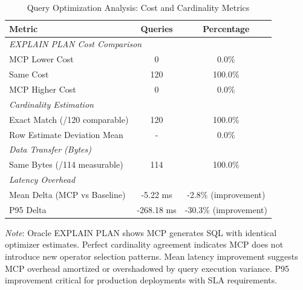 \begin{table}[h]
\centering
\caption{Query Optimization Analysis: Cost and Cardinality Metrics}
\label{tab:optimization_metrics}
\small
\begin{tabular}{lcc}
\toprule
\textbf{Metric} & \textbf{Queries} & \textbf{Percentage} \\
\midrule
\multicolumn{3}{l}{\textit{EXPLAIN PLAN Cost Comparison}} \\
MCP Lower Cost & 0 & 0.0\% \\
Same Cost & 120 & 100.0\% \\
MCP Higher Cost & 0 & 0.0\% \\
\midrule
\multicolumn{3}{l}{\textit{Cardinality Estimation}} \\
Exact Match (/120 comparable) & 120 & 100.0\% \\
Row Estimate Deviation Mean & - & 0.0\% \\
\midrule
\multicolumn{3}{l}{\textit{Data Transfer (Bytes)}} \\
Same Bytes (/114 measurable) & 114 & 100.0\% \\
\midrule
\multicolumn{3}{l}{\textit{Latency Overhead}} \\
Mean Delta (MCP vs Baseline) & -5.22 ms & -2.8\% (improvement) \\
P95 Delta & -268.18 ms & -30.3\% (improvement) \\
\bottomrule
\end{tabular}

\footnotesize
\textit{Note}: Oracle EXPLAIN PLAN shows MCP generates SQL with identical optimizer estimates. Perfect cardinality agreement indicates MCP does not introduce new operator selection patterns. Mean latency improvement suggests MCP overhead amortized or overshadowed by query execution variance. P95 improvement critical for production deployments with SLA requirements.
\end{table}
